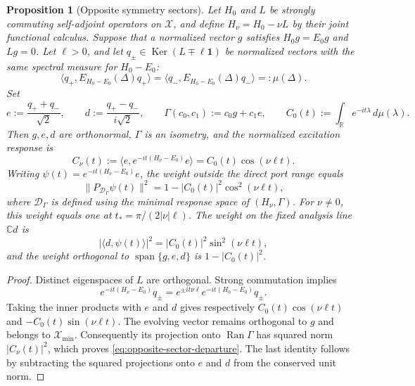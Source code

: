 \documentclass[11pt,reqno]{scrartcl}
\newcommand{\CC}{\mathbb C}
\newcommand{\RR}{\mathbb R}
\newcommand{\idop}{\mathbf 1}
\newcommand{\inner}[2]{\langle #1,#2\rangle}
\DeclareMathOperator{\Ran}{Ran}
\DeclareMathOperator{\Ker}{Ker}
\DeclareMathOperator{\Span}{span}
\newcommand{\scrX}{\mathscr X}
\newcommand{\Hmin}{\mathscr X_{\min}}
\theoremstyle{plain}
\newtheorem{proposition}[proposition]{Proposition}
\theoremstyle{definition}
\theoremstyle{remark}
\begin{document}
\begin{proposition}[Opposite symmetry sectors]
\label{prop:opposite-sector-response}
Let $H_0$ and $L$ be strongly commuting self-adjoint operators on $\scrX$,
and define $H_\nu=H_0-\nu L$ by their joint functional calculus.  Suppose
that a normalized vector $g$ satisfies $H_0g=E_0g$ and $Lg=0$.  Let
$\ell>0$, and let $q_\pm\in\Ker(L\mp\ell\idop)$ be normalized vectors
with the same spectral measure for $H_0-E_0$:
\begin{equation}
 \inner{q_+}{E_{H_0-E_0}(\Delta)q_+}
 =\inner{q_-}{E_{H_0-E_0}(\Delta)q_-}
 =:\mu(\Delta).
 \label{eq:opposite-sector-measure}
\end{equation}
Set
\begin{equation}
 e:=\frac{q_++q_-}{\sqrt2},\qquad
 d:=\frac{q_+-q_-}{i\sqrt2},\qquad
 \Gamma(c_0,c_1):=c_0g+c_1e,
 \qquad C_0(t):=\int_{\RR}e^{-it\lambda}\,d\mu(\lambda).
 \label{eq:opposite-sector-port}
\end{equation}
Then $g,e,d$ are orthonormal, $\Gamma$ is an isometry, and the normalized
excitation response is
\begin{equation}
 C_\nu(t):=\inner{e}{e^{-it(H_\nu-E_0)}e}
 =C_0(t)\cos(\nu\ell t).
 \label{eq:opposite-sector-factorization}
\end{equation}
Writing $\psi(t)=e^{-it(H_\nu-E_0)}e$, the weight outside the direct port
range equals
\begin{equation}
 \|P_{\mathcal D_\Gamma}\psi(t)\|^2
 =1-|C_0(t)|^2\cos^2(\nu\ell t),
 \label{eq:opposite-sector-departure}
\end{equation}
where $\mathcal D_\Gamma$ is defined using the minimal response space of
$(H_\nu,\Gamma)$.  For $\nu\ne0$, this weight equals one at
$t_* =\pi/(2|\nu|\ell)$.  The weight on the fixed analysis line $\CC d$ is
\begin{equation}
 |\inner{d}{\psi(t)}|^2
 =|C_0(t)|^2\sin^2(\nu\ell t),
 \label{eq:opposite-sector-fixed-line}
\end{equation}
and the weight orthogonal to $\Span\{g,e,d\}$ is $1-|C_0(t)|^2$.
\end{proposition}

\begin{proof}
Distinct eigenspaces of $L$ are orthogonal.  Strong commutation implies
\[
 e^{-it(H_\nu-E_0)}q_\pm
 =e^{\pm it\nu\ell}e^{-it(H_0-E_0)}q_\pm.
\]
Taking the inner products with $e$ and $d$ gives respectively
$C_0(t)\cos(\nu\ell t)$ and $-C_0(t)\sin(\nu\ell t)$.
The evolving vector remains orthogonal to $g$ and belongs to $\Hmin$.
Consequently its projection onto $\Ran\Gamma$ has squared norm
$|C_\nu(t)|^2$, which proves \eqref{eq:opposite-sector-departure}.
The last identity follows by subtracting the squared projections onto $e$
and $d$ from the conserved unit norm.
\end{proof}
\end{document}
